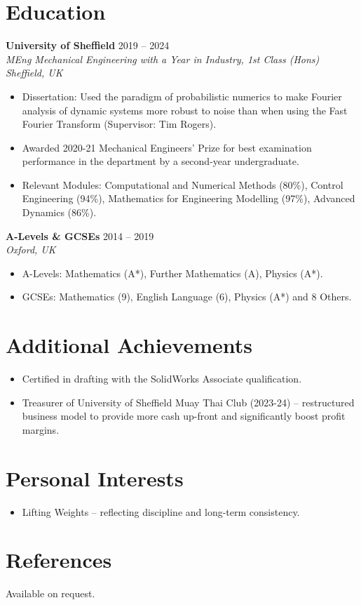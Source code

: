 \documentclass[a4paper,10pt]{article}
\newcommand{\resumeSubheading}[4]{
  \vspace{1pt}\textbf{#1} \hfill #2 \\
  \textit{#3} \hfill \textit{#4}
}
\newcommand{\resumeItem}[1]{\item{#1}}
\newcommand{\resumeItemListStart}{\begin{itemize}[leftmargin=*]}
\newcommand{\resumeItemListEnd}{\end{itemize}}
\begin{document}
\section{Education}

\resumeSubheading{University of Sheffield}{2019 -- 2024}{MEng Mechanical Engineering with a Year in Industry, 1st Class (Hons)}{Sheffield, UK}
\resumeItemListStart
  \resumeItem{Dissertation: Used the paradigm of probabilistic numerics to make Fourier analysis of dynamic systems more robust to noise than when using the Fast Fourier Transform (Supervisor: Tim Rogers).}
  \resumeItem{Awarded 2020-21 Mechanical Engineers' Prize for best examination performance in the department by a second-year undergraduate.}
  \resumeItem{Relevant Modules: Computational and Numerical Methods (80\%), Control Engineering (94\%), Mathematics for Engineering Modelling (97\%), Advanced Dynamics (86\%).}
\resumeItemListEnd

\resumeSubheading{A-Levels \& GCSEs}{2014 -- 2019}{}{Oxford, UK}

\vspace{-2em}

\resumeItemListStart
  \resumeItem{A-Levels: Mathematics (A*), Further Mathematics (A), Physics (A*).}
  \resumeItem{GCSEs: Mathematics (9), English Language (6), Physics (A*) and 8 Others.}
\resumeItemListEnd

\section{Additional Achievements}

\resumeItemListStart
  \resumeItem{Certified in drafting with the SolidWorks Associate qualification.}
  \resumeItem{Treasurer of University of Sheffield Muay Thai Club (2023-24) -- restructured business model to provide more cash up-front and significantly boost profit margins.}
\resumeItemListEnd

\section{Personal Interests}

\resumeItemListStart
  \resumeItem{Lifting Weights -- reflecting discipline and long-term consistency.}
\resumeItemListEnd

\section{References}
Available on request.
\end{document}
